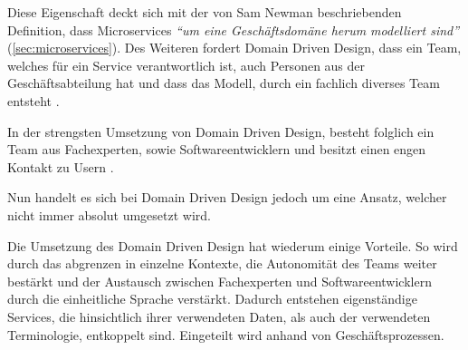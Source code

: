 Diese Eigenschaft deckt sich mit der von Sam Newman beschriebenden Definition, dass Microservices \textit{\enquote{um eine Geschäftsdomäne herum modelliert sind}} (\cref{sec:microservices}). Des Weiteren fordert Domain Driven Design, dass ein Team, welches für ein Service verantwortlich ist, auch Personen aus der Geschäftsabteilung hat und dass das Modell, durch ein fachlich diverses Team entsteht \parencite[vgl.][S. 32 ff.]{evans_domain-driven_2003}. 

In der strengsten Umsetzung von Domain Driven Design, besteht folglich ein Team aus Fachexperten, sowie Softwareentwicklern und besitzt einen engen Kontakt zu Usern \parencites[vgl.][Kap. 4.3]{wolff_microservices_2018}.

Nun handelt es sich bei Domain Driven Design jedoch um eine Ansatz, welcher nicht immer absolut umgesetzt wird.

Die Umsetzung des Domain Driven Design hat wiederum einige Vorteile. So wird durch das abgrenzen in einzelne Kontexte, die Autonomität des Teams weiter bestärkt und der Austausch zwischen Fachexperten und Softwareentwicklern durch die einheitliche Sprache verstärkt. Dadurch entstehen eigenständige Services, die hinsichtlich ihrer verwendeten Daten, als auch der verwendeten Terminologie, entkoppelt sind. Eingeteilt wird anhand von Geschäftsprozessen.